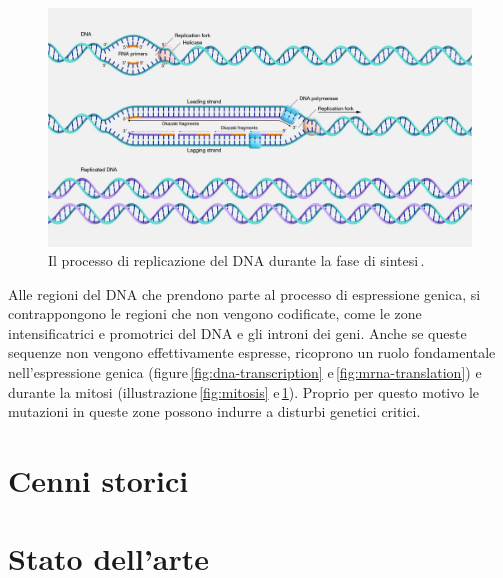 \begin{figure}[b!]
    \centering
    \includegraphics[width=\textwidth]{assets/dna-replication.jpg}
    \caption[Il processo di replicazione del DNA.]{Il processo di replicazione del DNA durante la fase di sintesi\,\cite{nhgri_dna_replication_image}.}\label{fig:dna-replication}
\end{figure}

Alle regioni del DNA che prendono parte al processo di espressione genica, si contrappongono le regioni che non vengono codificate, come le zone intensificatrici e promotrici del DNA e gli introni dei geni. Anche se queste sequenze non vengono effettivamente espresse, ricoprono un ruolo fondamentale nell'espressione genica (figure\,\ref{fig:dna-transcription} e\,\ref{fig:mrna-translation}) e durante la mitosi (illustrazione\,\ref{fig:mitosis} e\,\ref{fig:dna-replication}). Proprio per questo motivo le mutazioni in queste zone possono indurre a disturbi genetici critici. 




\section{Cenni storici}


\section{Stato dell'arte}

